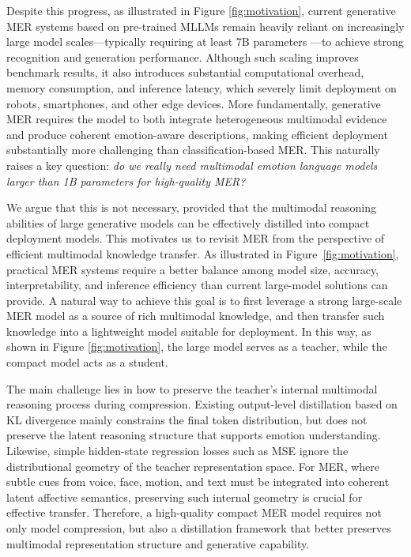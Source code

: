 \documentclass[sigconf]{acmart}
\begin{document}
Despite this progress, as illustrated in Figure \ref{fig:motivation}, current generative MER systems based on pre-trained MLLMs remain heavily reliant on increasingly large model scales—typically requiring at least 7B parameters \cite{EVLM2025, Emotion-LLaMA}—to achieve strong recognition and generation performance.
Although such scaling improves benchmark results, it also introduces substantial computational overhead, memory consumption, and inference latency, which severely limit deployment on robots, smartphones, and other edge devices. More fundamentally, generative MER requires the model to both integrate heterogeneous multimodal evidence and produce coherent emotion-aware descriptions, making efficient deployment substantially more challenging than classification-based MER. This naturally raises a key question: \textit{do we really need multimodal emotion language models larger than 1B parameters for high-quality MER?}

We argue that this is not necessary, provided that the multimodal reasoning abilities of large generative models can be effectively distilled into compact deployment models.
This motivates us to revisit MER from the perspective of efficient multimodal knowledge transfer. As illustrated in Figure~\ref{fig:motivation}, practical MER systems require a better balance among model size, accuracy, interpretability, and inference efficiency than current large-model solutions can provide. A natural way to achieve this goal is to first leverage a strong large-scale MER model as a source of rich multimodal knowledge, and then transfer such knowledge into a lightweight model suitable for deployment. In this way, as shown in Figure \ref{fig:motivation}, the large model serves as a teacher, while the compact model acts as a student.
 
The main challenge lies in how to preserve the teacher’s internal multimodal reasoning process during compression. Existing output-level distillation \cite{gu2026mini} based on KL divergence \cite{KL2014} mainly constrains the final token distribution, but does not preserve the latent reasoning structure that supports emotion understanding. Likewise, simple hidden-state regression losses such as MSE \cite{sun2019} ignore the distributional geometry of the teacher representation space. For MER, where subtle cues from voice, face, motion, and text must be integrated into coherent latent affective semantics, preserving such internal geometry is crucial for effective transfer. Therefore, a high-quality compact MER model requires not only model compression, but also a distillation framework that better preserves multimodal representation structure and generative capability.
\end{document}
